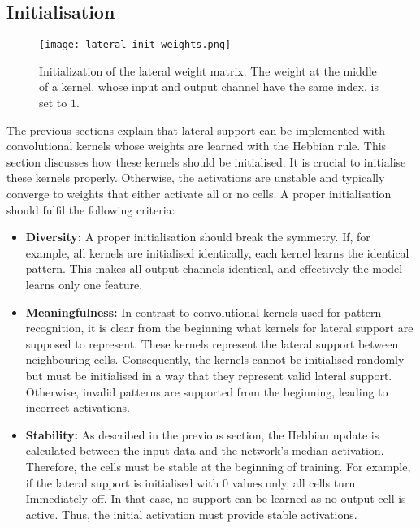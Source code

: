 \subsection{Initialisation}
\begin{figure}[h]
    \centering
    \texttt{[image: lateral\_init\_weights.png]}
    \caption[Initialization of the lateral weight matrix]{Initialization of the lateral weight matrix. The weight at the middle of a kernel, whose input and output channel have the same index, is set to $1$.}
\end{figure}
The previous sections explain that lateral support can be implemented with convolutional kernels whose weights are learned with the Hebbian rule.
This section discusses how these kernels should be initialised.
It is crucial to initialise these kernels properly. Otherwise, the activations are unstable and typically converge to weights that either activate all or no cells.
A proper initialisation should fulfil the following criteria:

\begin{itemize}
    \item \textbf{Diversity:} A proper initialisation should break the symmetry. If, for example, all kernels are initialised identically, each kernel learns the identical pattern. This makes all output channels identical, and effectively the model learns only one feature.
    \item \textbf{Meaningfulness:} In contrast to convolutional kernels used for pattern recognition, it is clear from the beginning what kernels for lateral support are supposed to represent. These kernels represent the lateral support between neighbouring cells. Consequently, the kernels cannot be initialised randomly but must be initialised in a way that they represent valid lateral support. Otherwise, invalid patterns are supported from the beginning, leading to incorrect activations.
    \item \textbf{Stability:} As described in the previous section, the Hebbian update is calculated between the input data and the network's median activation. Therefore, the cells must be stable at the beginning of training. For example, if the lateral support is initialised with $0$ values only, all cells turn Immediately off. In that case, no support can be learned as no output cell is active. Thus, the initial activation must provide stable activations.
\end{itemize}

